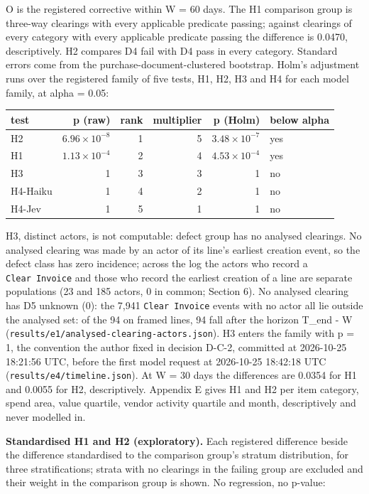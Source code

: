 \documentclass[
  10pt,
]{article}
\begin{document}
O is the registered corrective within W = 60 days. The H1 comparison
group is three-way clearings with every applicable predicate passing;
against clearings of every category with every applicable predicate
passing the difference is 0.0470, descriptively. H2 compares D4 fail
with D4 pass in every category. Standard errors come from the
purchase-document-clustered bootstrap. Holm's adjustment runs over the
registered family of five tests, H1, H2, H3 and H4 for each model
family, at alpha = 0.05:

\begin{longtable}[]{@{}lrrrrl@{}}
\toprule\noalign{}
test & p (raw) & rank & multiplier & p (Holm) & below alpha \\
\midrule\noalign{}
\endhead
\bottomrule\noalign{}
\endlastfoot
H2 & \(6.96 \times 10^{-8}\) & 1 & 5 & \(3.48 \times 10^{-7}\) & yes \\
H1 & \(1.13 \times 10^{-4}\) & 2 & 4 & \(4.53 \times 10^{-4}\) & yes \\
H3 & 1 & 3 & 3 & 1 & no \\
H4-Haiku & 1 & 4 & 2 & 1 & no \\
H4-Jev & 1 & 5 & 1 & 1 & no \\
\end{longtable}

H3, distinct actors, is not computable: defect group has no analysed
clearings. No analysed clearing was made by an actor of its line's
earliest creation event, so the defect class has zero incidence; across
the log the actors who record a \texttt{Clear\ Invoice} and those who
record the earliest creation of a line are separate populations (23 and
185 actors, 0 in common; Section 6). No analysed clearing has D5 unknown
(0): the 7,941 \texttt{Clear\ Invoice} events with no actor all lie
outside the analysed set: of the 94 on framed lines, 94 fall after the
horizon T\_end - W (\texttt{results/e1/analysed-clearing-actors.json}).
H3 enters the family with p = 1, the convention the author fixed in
decision D-C-2, committed at 2026-10-25 18:21:56 UTC, before the first
model request at 2026-10-25 18:42:18 UTC
(\texttt{results/e4/timeline.json}). At W = 30 days the differences are
0.0354 for H1 and 0.0055 for H2, descriptively. Appendix E gives H1 and
H2 per item category, spend area, value quartile, vendor activity
quartile and month, descriptively and never modelled in.

\textbf{Standardised H1 and H2 (exploratory).} Each registered
difference beside the difference standardised to the comparison group's
stratum distribution, for three stratifications; strata with no
clearings in the failing group are excluded and their weight in the
comparison group is shown. No regression, no p-value:
\end{document}

